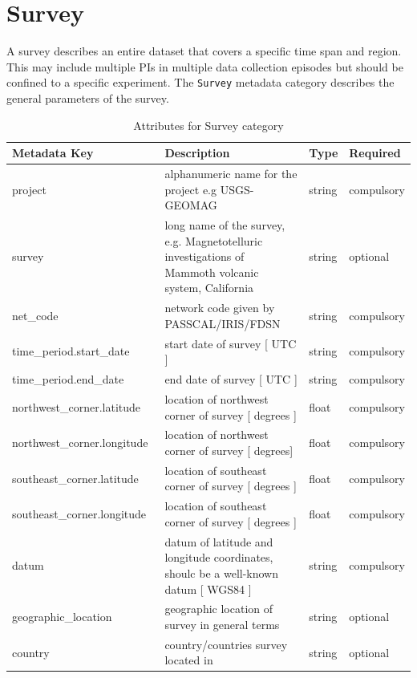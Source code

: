\documentclass{article}
\begin{document}
\clearpage
\newpage
\section{Survey}

A survey describes an entire dataset that covers a specific time span and region. This may include multiple PIs in multiple data collection episodes but should be confined to a specific experiment. The \verb|Survey| metadata category describes the general parameters of the survey.

\begin{table}[htb!]
	\centering
	\caption[Attributes for Survey]{Attributes for Survey category}
	\begin{tabular}{|l|p{3.65in}|l|l|}
		\hline
		\textbf{Metadata Key} & \textbf{Description} & \textbf{Type} & \textbf{Required} \\ \hline
		project & alphanumeric name for the project e.g USGS-GEOMAG & string & compulsory \\ \hline
		survey & long name of the survey, e.g. Magnetotelluric investigations of Mammoth volcanic system, California & string & optional \\ \hline
		net\_code\ & network code given by PASSCAL/IRIS/FDSN & string & compulsory \\ \hline
		time\_period.start\_date\ & start date of survey [ UTC ] & string & compulsory \\ \hline
		time\_period.end\_date\ & end date of survey [ UTC ] & string & compulsory \\ \hline
		northwest\_corner.latitude\ & location of northwest corner of survey [ degrees ] & float & compulsory \\ \hline
		northwest\_corner.longitude\ & location of northwest corner of survey [ degrees] & float & compulsory \\ \hline
		southeast\_corner.latitude\ & location of southeast corner of survey  [ degrees ] & float & compulsory \\ \hline
		southeast\_corner.longitude\ & location of southeast corner of survey  [ degrees ] & float & compulsory \\ \hline
		datum\ & datum of latitude and longitude coordinates, shoulc be a well-known datum [ WGS84 ] & string & compulsory \\ \hline
		geographic\_location\ & geographic location of survey in general terms & string & optional \\ \hline
		country\ & country/countries survey located in & string & optional \\ \hline

\end{tabular}
\end{table}
\end{document}

